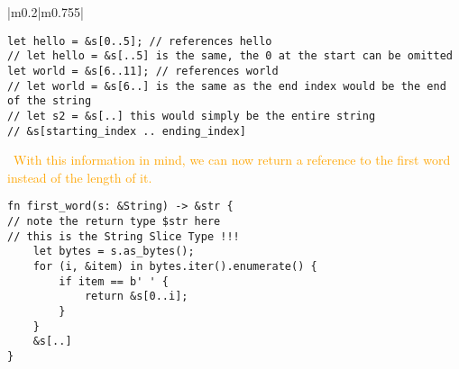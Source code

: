 \documentclass[main.tex,fontsize=8pt,paper=a4,paper=portrait,DIV=calc,]{scrartcl}
\begin{document}
\begin{table}[ht!]
\begin{tabular}{|m{0.2\linewidth}|m{0.755\linewidth}|}
\begin{lstlisting}
let hello = &s[0..5]; // references hello
// let hello = &s[..5] is the same, the 0 at the start can be omitted
let world = &s[6..11]; // references world
// let world = &s[6..] is the same as the end index would be the end of the string
// let s2 = &s[..] this would simply be the entire string
// &s[starting_index .. ending_index]
\end{lstlisting}
\, \newline
\textcolor{orange}{With this information in mind, we can now return a reference to the first word instead of the length of it.}\newline
\begin{lstlisting}
fn first_word(s: &String) -> &str {
// note the return type $str here
// this is the String Slice Type !!!
    let bytes = s.as_bytes();
    for (i, &item) in bytes.iter().enumerate() {
        if item == b' ' {
            return &s[0..i];
        }
    }
    &s[..]
}
\end{lstlisting}\\
\hline
\end{tabular}
\end{table}
\pagebreak 
\end{document}
